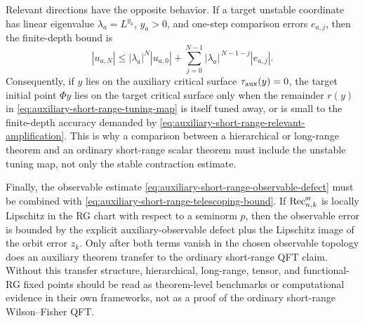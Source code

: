 Relevant directions have the opposite behavior.  If a target unstable
coordinate has linear eigenvalue \(\lambda_a=L^{y_a}\), \(y_a>0\), and
one-step comparison errors \(e_{a,j}\), then the finite-depth bound is
\begin{equation}
  |u_{a,N}|
  \leq
  |\lambda_a|^N |u_{a,0}|
  +
  \sum_{j=0}^{N-1}|\lambda_a|^{\,N-1-j}|e_{a,j}|.
  \label{eq:auxiliary-short-range-relevant-amplification}
\end{equation}
Consequently, if \(y\) lies on the auxiliary critical surface
\(\tau_{\rm aux}(y)=0\), the target initial point \(\Phi y\) lies on the
target critical surface only when the remainder \(r(y)\) in
\eqref{eq:auxiliary-short-range-tuning-map} is itself tuned away, or is small
to the finite-depth accuracy demanded by
\eqref{eq:auxiliary-short-range-relevant-amplification}.  This is why a
comparison between a hierarchical or long-range theorem and an ordinary
short-range scalar theorem must include the unstable tuning map, not only the
stable contraction estimate.

Finally, the observable estimate
\eqref{eq:auxiliary-short-range-observable-defect} must be combined with
\eqref{eq:auxiliary-short-range-telescoping-bound}.  If
\(\operatorname{Rec}^{\rm sr}_{n,k}\) is locally Lipschitz in the RG chart
with respect to a seminorm \(p\), then the observable error is bounded by the
explicit auxiliary-observable defect plus the Lipschitz image of the orbit
error \(z_k\).  Only after both terms vanish in the chosen observable
topology does an auxiliary theorem transfer to the ordinary short-range QFT
claim.  Without this transfer structure, hierarchical, long-range, tensor, and
functional-RG fixed points should be read as theorem-level benchmarks or
computational evidence in their own frameworks, not as a proof of the
ordinary short-range Wilson--Fisher QFT.

